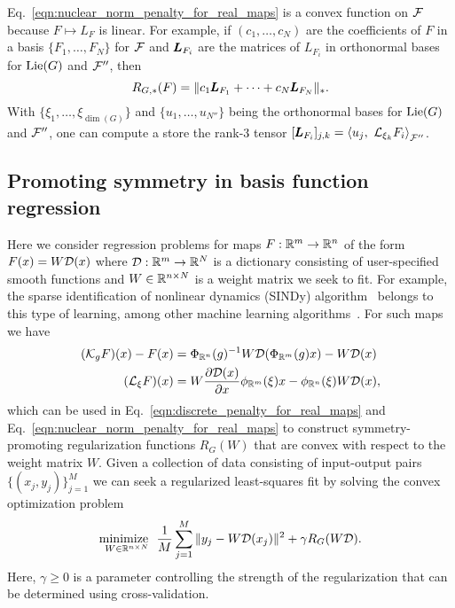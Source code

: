 \documentclass[twoside,11pt]{article}
\begin{document}
Eq.~\ref{eqn:nuclear_norm_penalty_for_real_maps} is a convex function on ${\mathcal{F}}$ because $F \mapsto L_F$ is linear.
For example, if $(c_1, \ldots, c_N)$ are the coefficients of $F$ in a basis $\{ F_1, \ldots, F_N \}$ for ${\mathcal{F}}$ and ${\pmb{L}}_{F_i}$ are the matrices of $L_{F_i}$ in orthonormal bases for $\operatorname{Lie}(G)$ and ${\mathcal{F}}''$, then
\begin{equation}
    R_{G,*}(F) = \Vert c_1 {\pmb{L}}_{F_1} + \cdots + c_N {\pmb{L}}_{F_N} \Vert_*.
\end{equation}
With $\{ \xi_1, \ldots, \xi_{\dim(G)} \}$ and $\{ u_{1}, \ldots, u_{N''} \}$ being the orthonormal bases for $\operatorname{Lie}(G)$ and ${\mathcal{F}}''$, one can compute a store the rank-$3$ tensor $[{\pmb{L}}_{F_i}]_{j,k} = \left\langle u_j,\ {\mathcal{L}}_{\xi_k} F_i \right\rangle_{{\mathcal{F}}''}$.

\subsection{Promoting symmetry in basis function regression}
\label{subsec:promoting_symmetry_in_regression}
Here we consider regression problems for maps $F:\mathbb{R}^m\to\mathbb{R}^n$ of the form $F(x) = W \mathcal{D}(x)$ where $\mathcal{D}:\mathbb{R}^m \to \mathbb{R}^N$ is a dictionary consisting of user-specified smooth functions and $W\in\mathbb{R}^{n\times N}$ is a weight matrix we seek to fit.  For example, the sparse identification of nonlinear dynamics (SINDy) algorithm~\citep{Brunton2016discovering} belongs to this type of learning, among other machine learning algorithms~\citep{Brunton2022book}. 
For such maps we have
\begin{align}
    ({\mathcal{K}}_g F)(x) - F(x) &= \Phi_{\mathbb{R}^n}(g)^{-1} W \mathcal{D}(\Phi_{\mathbb{R}^m}(g)x) - W\mathcal{D}(x) \\
    ({\mathcal{L}}_\xi F)(x) &= W\frac{\partial \mathcal{D}(x)}{\partial x}\phi_{\mathbb{R}^m}(\xi)x - \phi_{\mathbb{R}^n}(\xi) W \mathcal{D}(x),
\end{align}
which can be used in Eq.~\ref{eqn:discrete_penalty_for_real_maps} and Eq.~\ref{eqn:nuclear_norm_penalty_for_real_maps} to construct symmetry-promoting regularization functions $R_G(W)$ that are convex with respect to the weight matrix $W$.
Given a collection of data consisting of input-output pairs $\{ (x_j, y_j) \}_{j=1}^M$ we can seek a regularized least-squares fit by solving the convex optimization problem
\begin{equation}
    \operatorname*{\min\!imize\enskip}_{W\in\mathbb{R}^{n\times N}} \frac{1}{M}\sum_{j=1}^M \Vert y_j - W\mathcal{D}(x_j) \Vert^2 + \gamma R_G(W{\mathcal{D}}).
    \label{eqn:basis_function_regression_prob}
\end{equation}
Here, $\gamma \geq 0$ is a parameter controlling the strength of the regularization that can be determined using cross-validation.
\end{document}
